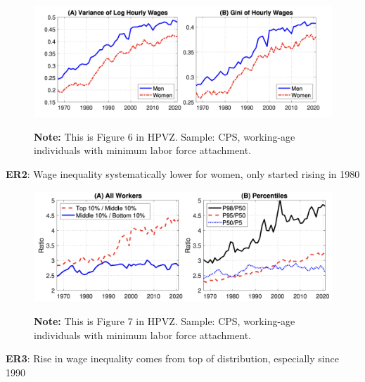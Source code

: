 \documentclass[11pt, aspectratio=169]{beamer}
\begin{document}
\begin{frame}{}
	\begin{figure}
		\includegraphics[scale=0.35]{./figures/inequality_wage_1}
	\vspace*{-4mm}
	\begin{flushleft}
		{\scriptsize \hspace{6mm} \textbf{Note:} This is Figure 6 in HPVZ. Sample: CPS, working-age individuals with minimum labor force attachment.}
	\end{flushleft}	
	\end{figure}

	\vspace{2mm}
	{\color{blue}\textbf{ER2}}: Wage inequality systematically lower for women, only started rising in 1980
\end{frame}


\begin{frame}{}
	\begin{figure}
		\includegraphics[scale=0.4]{./figures/inequality_wage_2}
	\vspace*{-2mm}
	\begin{flushleft}
		{\scriptsize \hspace{6mm} \textbf{Note:} This is Figure 7 in HPVZ. Sample: CPS, working-age individuals with minimum labor force attachment.}
	\end{flushleft}	
	\end{figure}

	\vspace{2mm}
	{\color{blue}\textbf{ER3}}: Rise in wage inequality comes from top of distribution, especially since 1990 
\end{frame}
\end{document}
